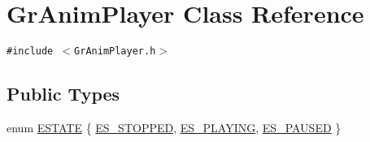 \hypertarget{class_gr_anim_player}{
\section{GrAnimPlayer Class Reference}
\label{class_gr_anim_player}
}
{\tt \#include $<$GrAnimPlayer.h$>$}

\subsection*{Public Types}
\begin{CompactItemize}
\item 
enum \hyperlink{class_gr_anim_player_b3c2ba6a58db17d254f4591ac28a0a75}{ESTATE} \{ \hyperlink{class_gr_anim_player_b3c2ba6a58db17d254f4591ac28a0a751ad3d481157b5fbc3ec9dfc5d8efe068}{ES\_\-STOPPED}, 
\hyperlink{class_gr_anim_player_b3c2ba6a58db17d254f4591ac28a0a75c76cc989afafb10f31b68a473b0f59c2}{ES\_\-PLAYING}, 
\hyperlink{class_gr_anim_player_b3c2ba6a58db17d254f4591ac28a0a75dab3961175599dee2295410ab28f5095}{ES\_\-PAUSED}
 \}

\end{CompactItemize}

